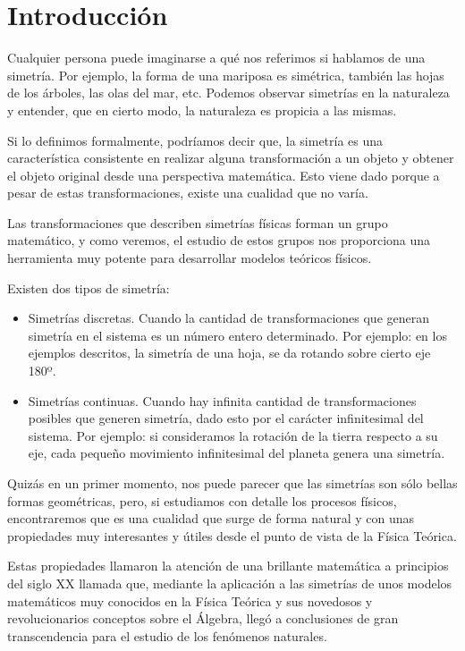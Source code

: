 \section{Introducción}\label{sec:introduccion}

Cualquier persona puede imaginarse a qué nos referimos si hablamos de una simetría. Por ejemplo, la forma de una mariposa es simétrica, también las hojas de los árboles, las olas del mar, etc. Podemos observar simetrías en la naturaleza y entender, que en cierto modo, la naturaleza es propicia a las mismas.

Si lo definimos formalmente, podríamos decir que, la simetría es una característica consistente en realizar alguna transformación a un objeto y obtener el objeto original desde una perspectiva matemática. Esto viene dado porque a pesar de estas transformaciones, existe una cualidad que no varía.

Las transformaciones que describen simetrías físicas forman un grupo matemático, y como veremos, el estudio de estos grupos nos proporciona una herramienta muy potente para desarrollar modelos teóricos físicos.

Existen dos tipos de simetría:
\begin{itemize}
    \item Simetrías discretas. Cuando la cantidad de transformaciones que generan simetría en el sistema es un número entero determinado. Por ejemplo: en los ejemplos descritos, la simetría de una hoja, se da rotando sobre cierto eje 180º.
    \item Simetrías continuas. Cuando hay infinita cantidad de transformaciones posibles que generen simetría, dado esto por el carácter infinitesimal del sistema. Por ejemplo: si consideramos la rotación de la tierra respecto a su eje, cada pequeño movimiento infinitesimal del planeta genera una simetría.
\end{itemize}

Quizás en un primer momento, nos puede parecer que las simetrías son sólo bellas formas geométricas, pero, si estudiamos con detalle los procesos físicos, encontraremos que es una cualidad que surge de forma natural y con unas propiedades muy interesantes y útiles desde el punto de vista de la Física Teórica.

Estas propiedades llamaron la atención de una brillante matemática a principios del siglo XX llamada  que, mediante la aplicación a las simetrías de unos modelos matemáticos muy conocidos en la Física Teórica y sus novedosos y revolucionarios conceptos sobre el Álgebra, llegó a conclusiones de gran transcendencia para el estudio de los fenómenos naturales.

